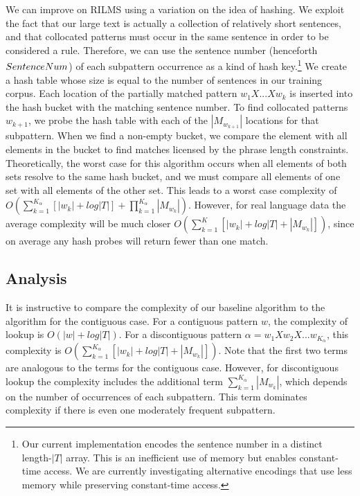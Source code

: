We can improve on RILMS
using a variation on the idea of hashing.  We exploit
the fact that our large text is actually a collection
of relatively short sentences, and that collocated patterns must
occur in the same sentence in order to be considered a rule.  Therefore, we can use the
sentence number (henceforth $SentenceNum$) of each subpattern occurrence 
as a kind of hash key.\footnote{Our current implementation encodes
the sentence number in a distinct length-$|T|$ array.  This is an inefficient
use of memory but enables constant-time access.  We are currently 
investigating alternative encodings that use less memory while
preserving constant-time access.}  We
create a hash table whose size is equal to the number of
sentences in our training corpus.  Each location of
the partially matched pattern $w_1 X ... X w_k$
is inserted into the hash bucket with the matching sentence
number.  To find collocated patterns $w_{k+1}$, we
probe the hash table with each of the $|M_{w_{k+1}}|$
locations for that subpattern.  When we find a non-empty 
bucket, we compare the element with all elements in the 
bucket to find matches licensed by
the phrase length constraints. Theoretically, the worst case 
for this algorithm occurs when all elements of both sets
resolve to the same hash bucket, and we must compare
all elements of one set with all elements of the other 
set.  This leads to a worst case complexity
of $O(\sum_{k=1}^{K_\alpha} \left[|w_k| + log |T|\right] + \prod_{k=1}^{K_\alpha} |M_{w_k}|)$.  
However, for real language data the average complexity
will be much closer $O(\sum_{k=1}^K \left[|w_k| + log |T| + |M_{w_k}|\right])$, 
since on average any hash probes will return fewer than one match.


\subsection{Analysis}\label{sec:baseline-analysis}

It is instructive to compare the complexity of our baseline
algorithm to the algorithm for the
contiguous case.  For a contiguous pattern $w$, the complexity of lookup
is $O(|w| + log |T|)$.  For a discontiguous pattern 
$\alpha = w_1 X w_2 X ... w_{K_\alpha}$, this complexity is
$O(\sum_{k=1}^{K_\alpha} \left[|w_k| + log |T| + |M_{w_k}|\right])$.
Note that the first two terms are analogous to 
the terms for the contiguous case.  However, 
for discontiguous lookup the complexity includes the additional 
term $\sum_{k=1}^{K_\alpha} |M_{w_k}|$, which depends on the number
of occurrences of each subpattern.  This term dominates complexity
if there is even one moderately frequent subpattern.

